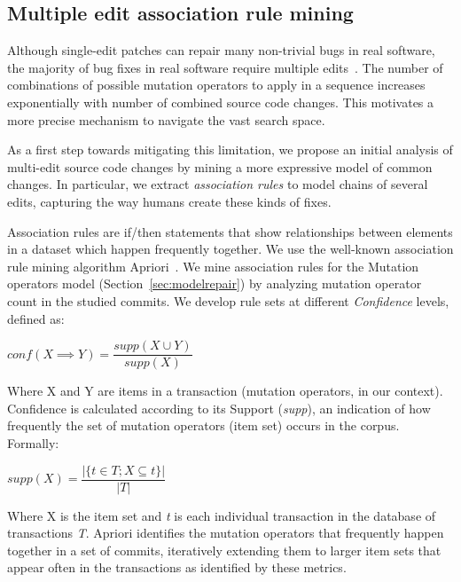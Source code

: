 \documentclass[conference]{IEEEtran}
\begin{document}
\subsection{Multiple edit association rule mining} 
\label{multEdit}

Although single-edit patches can
repair many non-trivial bugs in real software, the majority of bug fixes in real
software require multiple edits~\cite{zhong15,Soto16}. The number of combinations of possible mutation 
operators to apply in a sequence increases exponentially with number of combined source
code changes.  This motivates a more precise mechanism to navigate the vast search
space. 

As a first step towards mitigating this limitation, we propose 
an initial analysis of multi-edit 
source code changes by mining a more expressive model of common changes. In
particular, we extract \emph{association rules}
to model chains of several edits, capturing the way humans create these kinds of fixes.

Association rules are if/then statements that show relationships between elements in a dataset which happen frequently together. We use the 
well-known association rule mining algorithm
Apriori~\cite{Agrawal94}. 
%
We mine association rules for the Mutation operators model
(Section~\ref{sec:modelrepair}) by analyzing mutation operator count in
the studied commits. We develop 
rule sets at different \emph{Confidence} levels, defined as:

\begin{center}
$conf(X \implies Y) = \dfrac{supp(X \cup Y)}{supp(X)}$ 
\end{center}

Where X and Y are items in a transaction (mutation operators, in our
context). Confidence is calculated according to its Support (\emph{supp}), 
an indication of how frequently the set of mutation operators (item set) 
 occurs in the corpus.
Formally:

\begin{center}
$supp(X) = \dfrac{|\{t \in T; X \subseteq t\}|}{|T|}$
\end{center}

Where X is the item set and \emph{t} is each individual transaction in
the database of transactions \emph{T}. Apriori identifies the mutation
operators that frequently happen together in a set of commits, iteratively
extending them to larger 
item sets that appear often in the transactions as identified by these metrics.
\end{document}
